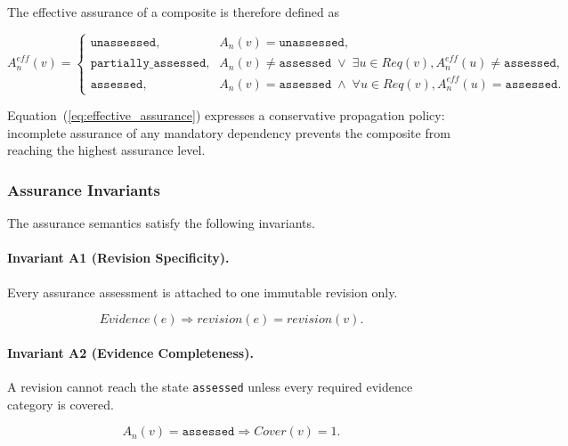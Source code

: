 \documentclass[10pt]{article}
\begin{document}
The effective assurance of a composite is therefore defined as

\begin{equation}
A_n^{eff}(v)
=
\begin{cases}
\texttt{unassessed},
&
A_n(v)=\texttt{unassessed},
\\[0.4em]
\texttt{partially\_assessed},
&
A_n(v)\neq\texttt{assessed}
\;\vee\;
\exists u\in Req(v),
A_n^{eff}(u)\neq\texttt{assessed},
\\[0.4em]
\texttt{assessed},
&
A_n(v)=\texttt{assessed}
\;\land\;
\forall u\in Req(v),
A_n^{eff}(u)=\texttt{assessed}.
\end{cases}
\label{eq:effective_assurance}
\end{equation}

Equation~(\ref{eq:effective_assurance}) expresses a conservative propagation
policy: incomplete assurance of any mandatory dependency prevents the composite
from reaching the highest assurance level.

\subsubsection{Assurance Invariants}

The assurance semantics satisfy the following invariants.

\paragraph{Invariant A1 (Revision Specificity).}

Every assurance assessment is attached to one immutable revision only.

\begin{equation}
Evidence(e)
\Longrightarrow
revision(e)
=
revision(v).
\label{eq:assurance_inv1}
\end{equation}

\paragraph{Invariant A2 (Evidence Completeness).}

A revision cannot reach the state
\texttt{assessed}
unless every required evidence category is covered.

\begin{equation}
A_n(v)=\texttt{assessed}
\Longrightarrow
Cover(v)=1.
\label{eq:assurance_inv2}
\end{equation}
\end{document}
